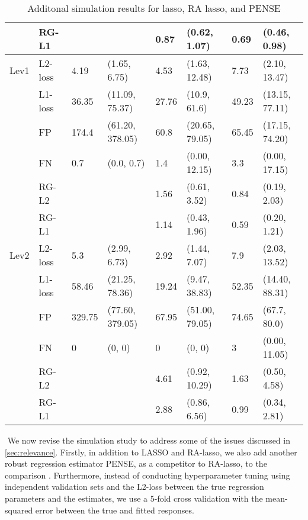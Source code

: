 \begin{table}[]
\begin{tabular}{llllllll}
       & RG-L1   &        &               & 0.87     & (0.62, 1.07)     & 0.69  & (0.46, 0.98)     \\ \hline
Lev1   & L2-loss & 4.19   & (1.65, 6.75)     & 4.53     & (1.63, 12.48)    & 7.73  & (2.10, 13.47)    \\
       & L1-loss & 36.35  & (11.09, 75.37)   & 27.76    & (10.9, 61.6)     & 49.23 & (13.15, 77.11)   \\
       & FP      & 174.4  & (61.20, 378.05)  & 60.8     & (20.65, 79.05)   & 65.45 & (17.15, 74.20)   \\
       & FN      & 0.7    & (0.0, 0.7)       & 1.4      & (0.00, 12.15)    & 3.3   & (0.00, 17.15)    \\
       & RG-L2   &        &               & 1.56     & (0.61, 3.52)     & 0.84  & (0.19, 2.03)     \\
       & RG-L1   &        &               & 1.14     & (0.43, 1.96)     & 0.59  & (0.20, 1.21)     \\ \hline
Lev2   & L2-loss & 5.3    & (2.99, 6.73)     & 2.92     & (1.44, 7.07)     & 7.9   & (2.03, 13.52)    \\
       & L1-loss & 58.46  & (21.25, 78.36)   & 19.24    & (9.47, 38.83)    & 52.35 & (14.40, 88.31)   \\
       & FP      & 329.75 & (77.60, 379.05)  & 67.95    & (51.00, 79.05)   & 74.65 & (67.7, 80.0)     \\
       & FN      & 0      & (0, 0)           & 0        & (0, 0)           & 3     & (0.00, 11.05)    \\
       & RG-L2   &        &               & 4.61     & (0.92, 10.29)    & 1.63  & (0.50, 4.58)     \\
       & RG-L1   &        &               & 2.88     & (0.86, 6.56)     & 0.99  & (0.34, 2.81)    
\end{tabular}
\caption{Additonal simulation results for lasso, RA lasso, and PENSE}\label{tab:revised}
\end{table}

$ $\newline
We now revise the simulation study to address some of the issues discussed in \cref{sec:relevance}. Firstly, in addition to LASSO and RA-lasso, we also add another robust regression estimator PENSE, as a competitor to RA-lasso, to the comparison \citep{freue2019robust}. Furthermore, instead of conducting hyperparameter tuning using independent validation sets and the L2-loss between the true regression parameters and the estimates, we use a 5-fold cross validation with the mean-squared error between the true and fitted responses.

